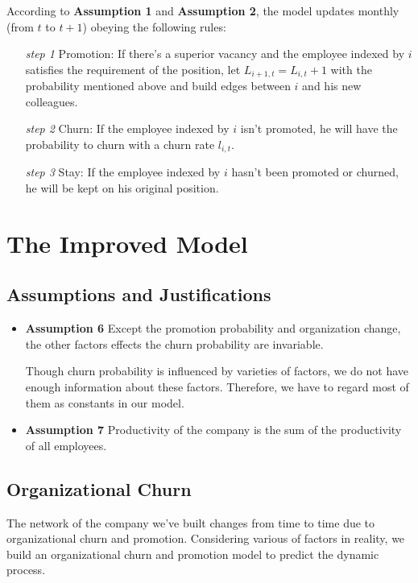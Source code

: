 \documentclass[12pt,a4paper,titlepage]{article}
\begin{document}
According to \textbf{Assumption 1} and \textbf{Assumption 2}, the
model updates monthly (from $t$ to $t+1$) obeying the following rules:

\begin{itemize}
\item [\textit{step 1}] Promotion: If there's a superior vacancy
  and the employee indexed by $i$ satisfies the requirement of the
  position, let $L_{i+1,t} =
  L_{i,t}+1$ with the probability mentioned above and build edges
  between   $i$ and his new colleagues.
\item [\textit{step 2}] Churn: If the employee indexed by $i$ isn't promoted, he will have the
  probability to churn with a churn rate $l_{i,t}$.
\item [\textit{step 3}] Stay: If the employee indexed by $i$ hasn't been promoted or churned,
  he will be kept on his original position.
\end{itemize}

\section{The Improved Model}
\label{sec:the-improved-model}

\subsection{Assumptions and Justifications}

\begin{itemize}
\item \textbf{Assumption 6} Except the promotion probability and
  organization change, the other factors effects the churn probability
  are invariable.

Though churn probability is influenced by varieties of factors, we do not  have enough information about these factors. Therefore, we have to
regard most of them as constants in our model.

\item \textbf{Assumption 7} Productivity of the company is the sum of the productivity of all employees.

\end{itemize}

\subsection{Organizational Churn}

The network of the company we've built changes from time to time due to
organizational churn and promotion. Considering various of factors in
reality, we build an organizational churn and promotion model to
predict the dynamic process.
\end{document}
